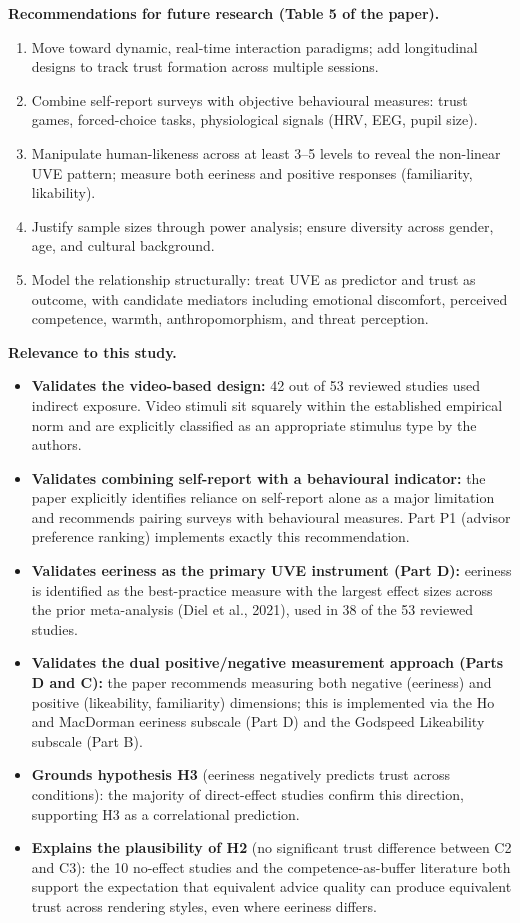 \documentclass[11pt, a4paper]{article}
\begin{document}
\medskip
\textbf{Recommendations for future research (Table 5 of the paper).}

\begin{enumerate}
  \item Move toward dynamic, real-time interaction paradigms; add longitudinal designs to track trust formation across multiple sessions.
  \item Combine self-report surveys with objective behavioural measures: trust games, forced-choice tasks, physiological signals (HRV, EEG, pupil size).
  \item Manipulate human-likeness across at least 3--5 levels to reveal the non-linear UVE pattern; measure both eeriness and positive responses (familiarity, likability).
  \item Justify sample sizes through power analysis; ensure diversity across gender, age, and cultural background.
  \item Model the relationship structurally: treat UVE as predictor and trust as outcome, with candidate mediators including emotional discomfort, perceived competence, warmth, anthropomorphism, and threat perception.
\end{enumerate}

\medskip
\textbf{Relevance to this study.}

\begin{itemize}
  \item \textbf{Validates the video-based design:} 42 out of 53 reviewed studies used indirect exposure. Video stimuli sit squarely within the established empirical norm and are explicitly classified as an appropriate stimulus type by the authors.
  \item \textbf{Validates combining self-report with a behavioural indicator:} the paper explicitly identifies reliance on self-report alone as a major limitation and recommends pairing surveys with behavioural measures. Part P1 (advisor preference ranking) implements exactly this recommendation.
  \item \textbf{Validates eeriness as the primary UVE instrument (Part D):} eeriness is identified as the best-practice measure with the largest effect sizes across the prior meta-analysis (Diel et al., 2021), used in 38 of the 53 reviewed studies.
  \item \textbf{Validates the dual positive/negative measurement approach (Parts D and C):} the paper recommends measuring both negative (eeriness) and positive (likeability, familiarity) dimensions; this is implemented via the Ho and MacDorman eeriness subscale (Part D) and the Godspeed Likeability subscale (Part B).
  \item \textbf{Grounds hypothesis H3} (eeriness negatively predicts trust across conditions): the majority of direct-effect studies confirm this direction, supporting H3 as a correlational prediction.
  \item \textbf{Explains the plausibility of H2} (no significant trust difference between C2 and C3): the 10 no-effect studies and the competence-as-buffer literature both support the expectation that equivalent advice quality can produce equivalent trust across rendering styles, even where eeriness differs.
\end{itemize}
\end{document}
